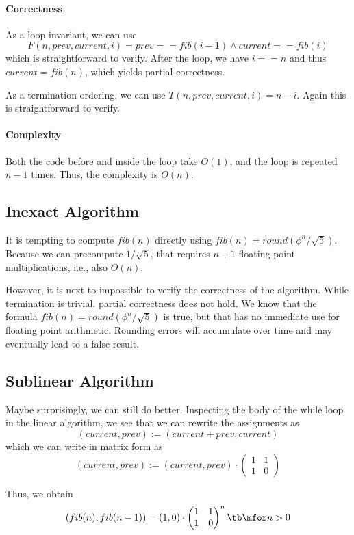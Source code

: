 \paragraph{Correctness}
As a loop invariant, we can use
\[F(n,prev,current,i) = prev==fib(i-1)\wedge current==fib(i)\]
which is straightforward to verify.
After the loop, we have $i==n$ and thus $current=fib(n)$, which yields partial correctness.

As a termination ordering, we can use $T(n,prev,current,i)=n-i$.
Again this is straightforward to verify.

\paragraph{Complexity}
Both the code before and inside the loop take $O(1)$, and the loop is repeated $n-1$ times.
Thus, the complexity is $O(n)$.

\subsection{Inexact Algorithm}\label{sec:ad:fib:inexact}

It is tempting to compute $fib(n)$ directly using $fib(n)=round(\phi^n/\sqrt{5})$.
Because we can precompute $1/\sqrt{5}$, that requires $n+1$ floating point multiplications, i.e., also $O(n)$.

However, it is next to impossible to verify the correctness of the algorithm.
While termination is trivial, partial correctness does not hold.
We know that the formula $fib(n)=round(\phi^n/\sqrt{5})$ is true, but that has no immediate use for floating point arithmetic.
Rounding errors will accumulate over time and may eventually lead to a false result.

\subsection{Sublinear Algorithm}\label{sec:ad:fib:sublinear}

Maybe surprisingly, we can still do better.
Inspecting the body of the while loop in the linear algorithm, we see that we can rewrite the assignments as
\[(current,prev):=(current+prev, current)\]
which we can write in matrix form as
\[(current,prev):=(current,prev)\cdot\begin{pmatrix}1&1\\1&0\end{pmatrix}\]

Thus, we obtain
\[(fib(n),fib(n-1))= (1,0)\cdot\begin{pmatrix}1&1\\1&0\end{pmatrix}^n \tb\mfor n>0\]

